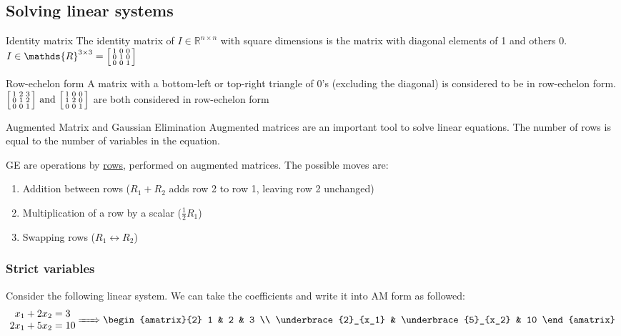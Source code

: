 \documentclass{article}
\begin{document}
\subsection{Solving linear systems}
\begin{knBox}[]{Identity matrix}
    The identity matrix of $I\in \mathds{R}^{n\times n}$ with square dimensions is the matrix with diagonal elements of 1 and others 0.
    \tcblower
    $I\in \mathds{R}^{3\times 3}=\begin{bsmallmatrix}
            1&0&0\\0&1&0\\0&0&1
        \end{bsmallmatrix}$
\end{knBox}
\begin{knBox}[]{Row-echelon form}
    A matrix with a bottom-left or top-right triangle of 0's (excluding the diagonal) is considered to be in row-echelon form.
    \tcblower
    $\begin{bsmallmatrix}
            1&2&3\\0&1&2\\0&0&1
        \end{bsmallmatrix}\text{ and }\begin{bsmallmatrix}
            1&0&0\\1&2&0\\0&0&1
        \end{bsmallmatrix}$ are both considered in row-echelon form
\end{knBox}

\begin{knBox}[]{Augmented Matrix and Gaussian Elimination}
    Augmented matrices are an important tool to solve linear equations. The number of rows is equal to the number of variables in the equation.

    GE are operations by \underline{rows}, performed on augmented matrices. The possible moves are:
    \begin{enumerate}
        \item Addition between rows ($R_1 + R_2$ adds row 2 to row 1, leaving row 2 unchanged)
        \item Multiplication of a row by a scalar ($\frac{1}{2}R_1$)
        \item Swapping rows ($R_1\leftrightarrow R_2$)
    \end{enumerate}
\end{knBox}

\subsubsection{Strict variables}
Consider the following linear system. We can take the coefficients and write it into AM form as followed:
\[
    \begin{matrix}
        x_1 + 2x_2 = 3 \\
        2x_1 + 5x_2 = 10
    \end{matrix}\xRightarrow{\hspace{0.5cm}}
    \begin{amatrix}{2}
        1 & 2 & 3 \\ \underbrace{2}_{x_1} & \underbrace{5}_{x_2} & 10
    \end{amatrix}
\]
\end{document}
